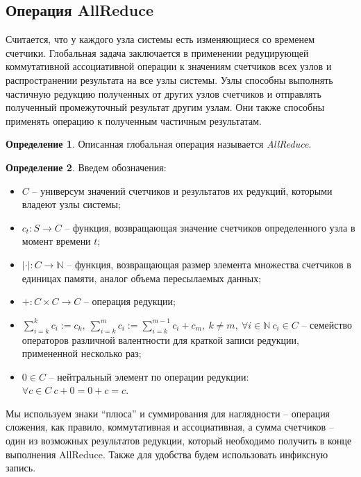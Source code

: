 \documentclass{article}
\theoremstyle{plain}
\theoremstyle{plain}
\theoremstyle{plain}
\theoremstyle{plain}
\theoremstyle{definition}
\newtheorem{definition}{Определение}[section]
\theoremstyle{remark}
\theoremstyle{plain}
\begin{document}
\subsection{Операция AllReduce}

Считается, что у каждого узла системы есть изменяющиеся со временем счетчики. Глобальная задача заключается в применении редуцирующей коммутативной ассоциативной операции к значениям счетчиков всех узлов и распространении результата на все узлы системы. Узлы способны выполнять частичную редукцию полученных от других узлов счетчиков и отправлять полученный промежуточный результат другим узлам. Они также способны применять операцию к полученным частичным результатам.

\begin{definition}
    Описанная глобальная операция называется \textit{AllReduce}.
\end{definition}

\begin{definition}
    Введем обозначения:
    \begin{itemize}
        \item $C$ -- универсум значений счетчиков и результатов их редукций, которыми владеют узлы системы;
        \item $c_t : S \to C$ -- функция, возвращающая значение счетчиков определенного узла в момент времени $t$;
        \item $|\cdot| : C \to \mathbb{N}$ -- функция, возвращающая размер элемента множества счетчиков в единицах памяти, аналог объема пересылаемых данных;
        \item $+ : C \times C \to C$ -- операция редукции;
        \item $\displaystyle \sum_{i = k}^k c_i := c_k,\ \displaystyle \sum_{i = k}^m c_i := \displaystyle \sum_{i = k}^{m - 1} c_i + c_m,\ k \neq m,\ \forall i \in \mathbb{N}\ c_i \in C$ -- семейство операторов различной валентности для краткой записи редукции, примененной несколько раз;
        \item $0 \in C$ -- нейтральный элемент по операции редукции: $\forall c \in C\ c + 0 = 0 + c = c$.
    \end{itemize}
\end{definition}

Мы используем знаки \enquote{плюса} и суммирования для наглядности -- операция сложения, как правило, коммутативная и ассоциативная, а сумма счетчиков -- один из возможных результатов редукции, который необходимо получить в конце выполнения AllReduce. Также для удобства будем использовать инфиксную запись.
\end{document}
